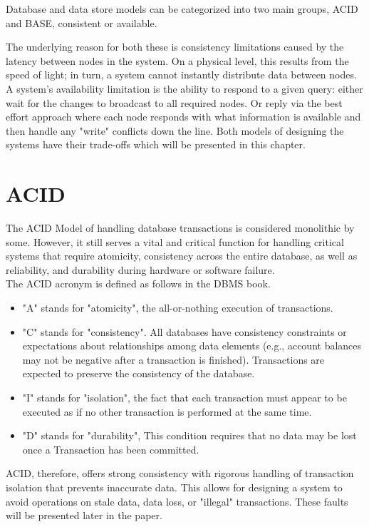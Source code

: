 \documentclass[a4paper,10pt,titlepage]{report}
\begin{document}
    Database and data store models can be categorized into two main groups, ACID and BASE, consistent or available.

    The underlying reason for both these is consistency limitations caused by the latency between nodes in the system. On a physical level, this results from the speed of light; in turn, a system cannot instantly distribute data between nodes. A system's availability limitation is the ability to respond to a given query: either wait for the changes to broadcast to all required nodes. Or reply via the best effort approach where each node responds with what information is available and then handle any "write" conflicts down the line. Both models of designing the systems have their trade-offs which will be presented in this chapter.


    \section{ACID}
    The ACID Model of handling database transactions is considered monolithic by some. However, it still serves a vital and critical function for handling critical systems that require atomicity, consistency across the entire database, as well as reliability, and durability during hardware or software failure.\\
    \vspace{5mm}
    The ACID acronym is defined as follows in the DBMS book\cite{DBMSbook}.

    \begin{itemize}
        \item "A" stands for "atomicity", the all-or-nothing execution of transactions.
        \item "C" stands for "consistency". All databases have consistency constraints or expectations about relationships among data elements (e.g., account balances may not be negative after a transaction is finished). Transactions are expected to preserve the consistency of the database.
        \item "I" stands for "isolation", the fact that each transaction must appear to be executed as if no other transaction is performed at the same time.
        \item "D" stands for "durability", This condition requires that no data may be lost once a Transaction has been committed.
    \end{itemize}

    ACID, therefore, offers strong consistency with rigorous handling of transaction isolation that prevents inaccurate data. This allows for designing a system to avoid operations on stale data, data loss, or "illegal" transactions. These faults will be presented later in the paper.
\end{document}
